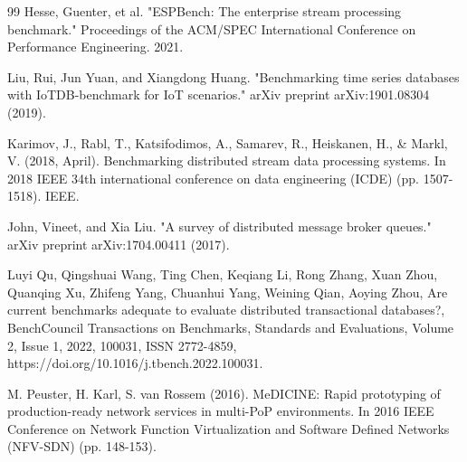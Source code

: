 \documentclass[runningheads]{llncs}
\begin{document}
\begin{thebibliography}{99}
%
Hesse, Guenter, et al. "ESPBench: The enterprise stream processing benchmark." Proceedings of the ACM/SPEC International Conference on Performance Engineering. 2021.

%
Liu, Rui, Jun Yuan, and Xiangdong Huang. "Benchmarking time series databases with IoTDB-benchmark for IoT scenarios." arXiv preprint arXiv:1901.08304 (2019).

%
Karimov, J., Rabl, T., Katsifodimos, A., Samarev, R., Heiskanen, H., \& Markl, V. (2018, April). Benchmarking distributed stream data processing systems. In 2018 IEEE 34th international conference on data engineering (ICDE) (pp. 1507-1518). IEEE.

%
John, Vineet, and Xia Liu. "A survey of distributed message broker queues." arXiv preprint arXiv:1704.00411 (2017).

%
Luyi Qu, Qingshuai Wang, Ting Chen, Keqiang Li, Rong Zhang, Xuan Zhou, Quanqing Xu, Zhifeng Yang, Chuanhui Yang, Weining Qian, Aoying Zhou,
Are current benchmarks adequate to evaluate distributed transactional databases?,
BenchCouncil Transactions on Benchmarks, Standards and Evaluations,
Volume 2, Issue 1,
2022,
100031,
ISSN 2772-4859,
https://doi.org/10.1016/j.tbench.2022.100031.

%
M. Peuster, H. Karl, S. van Rossem (2016). MeDICINE: Rapid prototyping of production-ready network services in multi-PoP environments. In 2016 IEEE Conference on Network Function Virtualization and Software Defined Networks (NFV-SDN) (pp. 148-153).

\end{thebibliography}
\fi
\end{document}
